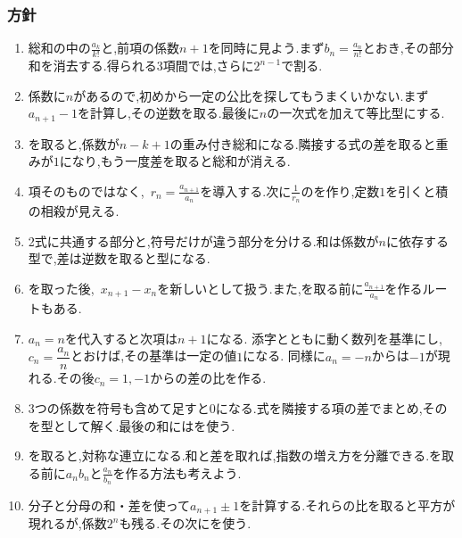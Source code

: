       \subsubsection{方針}\label{節：応用難易度：方針}\label{節：高難易度のもの：方針}
        \begin{enumerate}[label=\textbf{問\arabic*.},leftmargin=3.8em,format=\bookitemlink{practice-advanced}{hint}{problem}]
          \item 総和の中の$\displaystyle \frac{a_k}{k!}$と,前項の係数$n+1$を同時に見よう.まず$\displaystyle b_n=\frac{a_n}{n!}$とおき,その部分和を消去する.得られる3項間では,さらに$2^{n-1}$で割る.
          \item 係数に$n$があるので,初めから一定の公比を探してもうまくいかない.まず$a_{n+1}-1$を計算し,その逆数を取る.最後に$n$の一次式を加えて等比型にする.
          \item {}を取ると,係数が$n-k+1$の重み付き総和になる.隣接する式の差を取ると重みが$1$になり,もう一度差を取ると総和が消える.
          \item 項そのものではなく,\, $\displaystyle r_n=\frac{a_{n+1}}{a_n}$を導入する.次に$\displaystyle \frac{1}{r_n}$のを作り,定数$1$を引くと積の相殺が見える.
          \item 2式に共通する部分と,符号だけが違う部分を分ける.和は係数が$n$に依存する型で,差は逆数を取ると型になる.
          \item {}を取った後,\, $x_{n+1}-x_n$を新しいとして扱う.また,を取る前に$\displaystyle \frac{a_{n+1}}{a_n}$を作るルートもある.
          \item $a_n=n$を代入すると次項は$n+1$になる.
                添字とともに動く数列を基準にし,$c_n=\dfrac{a_n}{n}$とおけば,その基準は一定の値$1$になる.
                同様に$a_n=-n$からは$-1$が現れる.その後$c_n=1,-1$からの差の比を作る.
          \item 3つの係数を符号も含めて足すと$0$になる.式を隣接する項の差でまとめ,そのを型として解く.最後の和にはを使う.
          \item {}を取ると,対称な連立になる.和と差を取れば,指数の増え方を分離できる.を取る前に$a_nb_n$と$\displaystyle \frac{a_n}{b_n}$を作る方法も考えよう.
          \item 分子と分母の和・差を使って$a_{n+1}\pm1$を計算する.それらの比を取ると平方が現れるが,係数$2^n$も残る.その次にを使う.
        \end{enumerate}

